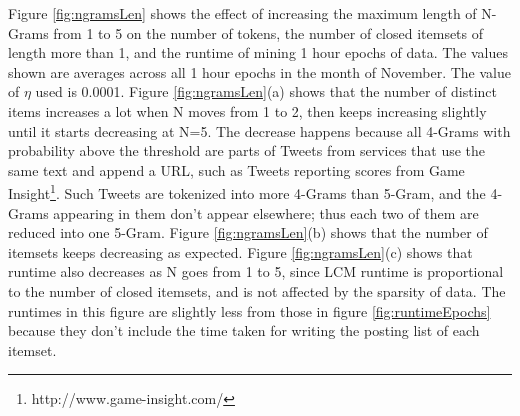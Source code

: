 \documentclass{sig-alternate}
\begin{document}
Figure \ref{fig:ngramsLen} shows the effect of increasing the maximum length of N-Grams from 1 to 5 on the number of tokens, the number of closed itemsets of length more than 1, and the runtime of mining 1 hour epochs of data. The values shown are averages across all 1 hour epochs in the month of November. The value of $\eta$ used is 0.0001.
Figure \ref{fig:ngramsLen}(a) shows that the number of distinct items increases a lot when N moves from 1 to 2, then keeps increasing slightly until it starts decreasing at N=5. The decrease happens because all 4-Grams with probability above the threshold are parts of Tweets from services that use the same text and append a URL, such as Tweets reporting scores from Game Insight\footnote{http://www.game-insight.com/}. Such Tweets are tokenized into more 4-Grams than 5-Gram, and the 4-Grams appearing in them don't appear elsewhere; thus each two of them are reduced into one 5-Gram.  Figure \ref{fig:ngramsLen}(b) shows that the number of itemsets keeps decreasing as expected.  Figure \ref{fig:ngramsLen}(c) shows that runtime also decreases as N goes from 1 to 5, since LCM runtime is proportional to the number of closed itemsets, and is not affected by the sparsity of data. The runtimes in this figure are slightly less from those in figure \ref{fig:runtimeEpochs} because they don't include the time taken for writing the posting list of each itemset.
\end{document}
